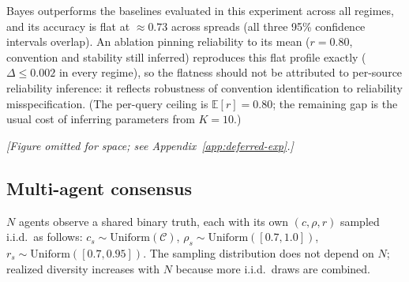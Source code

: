 Bayes outperforms the baselines evaluated in this experiment across all
regimes, and its accuracy is flat at $\approx 0.73$ across spreads (all
three 95\% confidence intervals overlap). An ablation pinning reliability
to its mean ($r = 0.80$, convention and stability still inferred)
reproduces this flat profile exactly ($\Delta \leq 0.002$ in every
regime), so the flatness should not be attributed to per-source
reliability inference: it reflects robustness of convention
identification to reliability misspecification. (The per-query ceiling is
$\mathbb{E}[r] = 0.80$; the remaining gap is the usual cost of inferring
parameters from $K = 10$.)



\begin{center}
\emph{[Figure omitted for space; see Appendix~\ref{app:deferred-exp}.]}
\end{center}


\subsection{Multi-agent consensus}

$N$ agents observe a shared binary truth, each with its own $(c, \rho, r)$
sampled i.i.d.\ as follows:
$c_s \sim \mathrm{Uniform}(\mathcal{C})$,
$\rho_s \sim \mathrm{Uniform}([0.7, 1.0])$,
$r_s \sim \mathrm{Uniform}([0.7, 0.95])$.
The sampling distribution does not depend on $N$; realized diversity
increases with $N$ because more i.i.d.\ draws are combined.

\begin{table}[h]
\centering
\footnotesize
\caption{Group accuracy vs.\ number of agents under mixed conventions; mean $\pm$ 95\% CI over 30 seeds.}
\label{tab:consensus}
\end{table}

